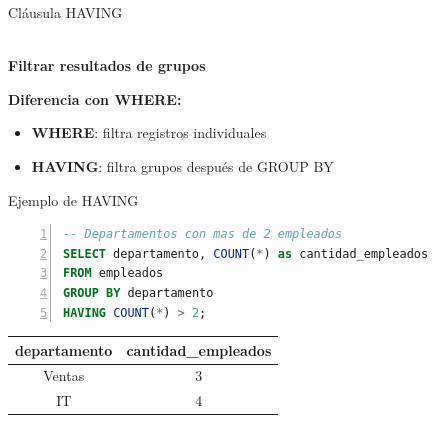 \documentclass{beamer}
\begin{document}
\begin{frame}{Cláusula HAVING}
    \begin{center}
        {\Large \faFilter}\\[0.2cm]
        \textbf{Filtrar resultados de grupos}
    \end{center}

    \vspace{0.3cm}

    \textbf{Diferencia con WHERE:}
    \begin{itemize}
        \item[{\makebox[1em][c]{\textcolor{black}{\faTable}}}] \textbf{WHERE}: filtra registros individuales
        \item[{\makebox[1em][c]{\textcolor{black}{\faUsers}}}] \textbf{HAVING}: filtra grupos después de GROUP BY
    \end{itemize}
\end{frame}

\begin{frame}[fragile]{Ejemplo de HAVING}
    \begin{lstlisting}[language=SQL, numbers=left, numbersep=5pt]
-- Departamentos con mas de 2 empleados
SELECT departamento, COUNT(*) as cantidad_empleados
FROM empleados
GROUP BY departamento
HAVING COUNT(*) > 2;
    \end{lstlisting}

    \vspace{0.3cm}

    \begin{center}
        \begin{tabular}{cc}
            \toprule
            departamento & cantidad\_empleados \\
            \midrule
            Ventas & 3 \\
            IT & 4 \\
            \bottomrule
        \end{tabular}
    \end{center}
\end{frame}
\end{document}
